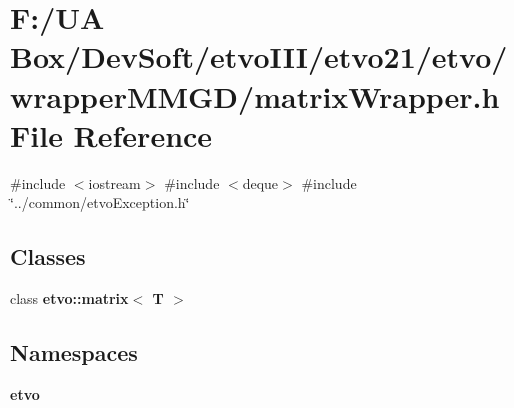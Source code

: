 \section{F\+:/\+UA Box/\+Dev\+Soft/etvo\+I\+I\+I/etvo21/etvo/wrapper\+M\+M\+G\+D/matrix\+Wrapper.h File Reference}
\label{matrix_wrapper_8h}
{\ttfamily \#include $<$iostream$>$}\newline
{\ttfamily \#include $<$deque$>$}\newline
{\ttfamily \#include \char`\"{}../common/etvo\+Exception.\+h\char`\"{}}\newline
\subsection*{Classes}
\begin{DoxyCompactItemize}
\item 
class \textbf{ etvo\+::matrix$<$ T $>$}
\end{DoxyCompactItemize}
\subsection*{Namespaces}
\begin{DoxyCompactItemize}
\item 
 \textbf{ etvo}
\end{DoxyCompactItemize}
